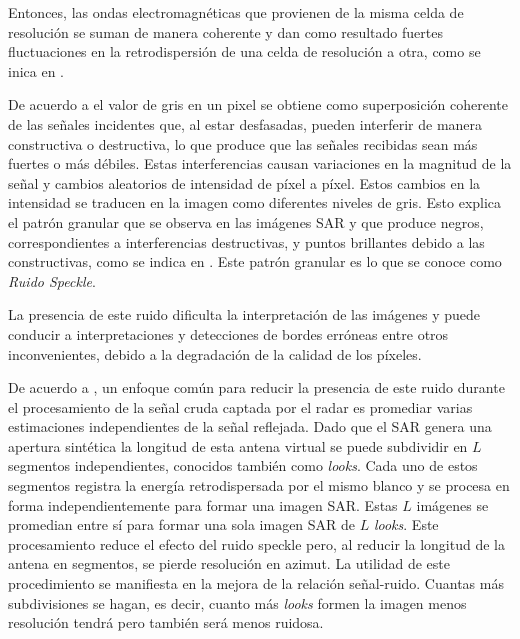 Entonces, las ondas electromagnéticas que provienen de la misma celda de resolución se suman de manera coherente y dan como resultado fuertes fluctuaciones en la retrodispersión de una celda de resolución a otra, como se inica en \citet{oliverquegan98}. 

De acuerdo a \citet{Shahrezaei2019} el valor de gris en un pixel se obtiene como superposición coherente de las señales incidentes que, al estar desfasadas, pueden interferir de manera constructiva o destructiva, lo que produce que las señales recibidas sean más fuertes o más débiles. Estas interferencias causan variaciones en la magnitud de la señal y cambios aleatorios de intensidad de píxel a píxel. Estos cambios en la intensidad se traducen en la imagen como diferentes niveles de gris. Esto explica el patrón granular que se observa en las imágenes SAR y que produce negros, correspondientes a interferencias destructivas, y puntos brillantes debido a las constructivas, como se indica en \citet{Yahya2014}. Este patrón granular es lo que se conoce como \textit{Ruido Speckle}.

La presencia de este ruido dificulta la interpretación de las imágenes y puede conducir a interpretaciones y detecciones de bordes erróneas entre otros inconvenientes, debido a la degradación de la calidad de los píxeles. 

De acuerdo a \citet{Lee2009}, un enfoque común para reducir la presencia de este ruido durante el procesamiento de la señal cruda captada por el radar es promediar varias estimaciones independientes de la señal reflejada. Dado que el SAR genera una apertura sintética la longitud de esta antena virtual se puede subdividir en $L$  segmentos independientes, conocidos también como \textit{looks}. Cada uno de estos segmentos registra la energía retrodispersada por el mismo blanco y se procesa en forma independientemente para formar una imagen SAR. Estas $L$ imágenes se promedian entre sí para formar una sola imagen SAR de $L$ \textit{looks}. Este procesamiento reduce el efecto del ruido speckle pero, al reducir la longitud de la antena en segmentos, se pierde resolución en azimut. La utilidad de este procedimiento se manifiesta en la mejora de la relación señal-ruido. Cuantas más subdivisiones se hagan, es decir, cuanto más \textit{looks} formen la imagen menos resolución tendrá pero también será menos ruidosa.

